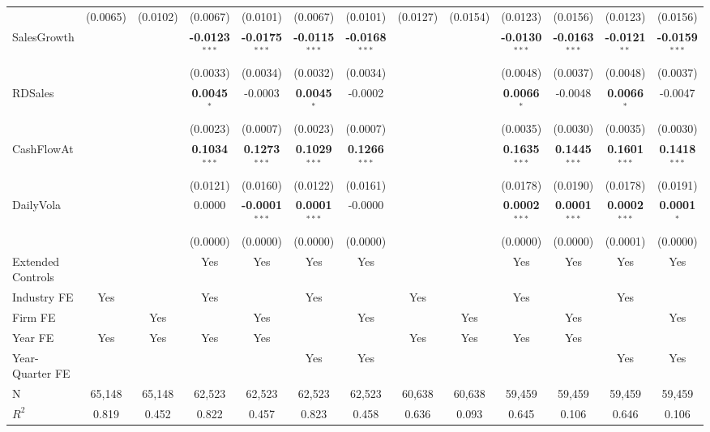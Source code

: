 \begin{landscape}
\begin{table}[H]
\begin{tabular}{lcccccccccccc}
 & (0.0065) & (0.0102) & (0.0067) & (0.0101) & (0.0067) & (0.0101) & (0.0127) & (0.0154) & (0.0123) & (0.0156) & (0.0123) & (0.0156) \\
SalesGrowth &  &  & \textbf{-0.0123}$^{***}$ & \textbf{-0.0175}$^{***}$ & \textbf{-0.0115}$^{***}$ & \textbf{-0.0168}$^{***}$ &  &  & \textbf{-0.0130}$^{***}$ & \textbf{-0.0163}$^{***}$ & \textbf{-0.0121}$^{**}$ & \textbf{-0.0159}$^{***}$ \\
 &  &  & (0.0033) & (0.0034) & (0.0032) & (0.0034) &  &  & (0.0048) & (0.0037) & (0.0048) & (0.0037) \\
RDSales &  &  & \textbf{0.0045}$^{*}$ & -0.0003 & \textbf{0.0045}$^{*}$ & -0.0002 &  &  & \textbf{0.0066}$^{*}$ & -0.0048 & \textbf{0.0066}$^{*}$ & -0.0047 \\
 &  &  & (0.0023) & (0.0007) & (0.0023) & (0.0007) &  &  & (0.0035) & (0.0030) & (0.0035) & (0.0030) \\
CashFlowAt &  &  & \textbf{0.1034}$^{***}$ & \textbf{0.1273}$^{***}$ & \textbf{0.1029}$^{***}$ & \textbf{0.1266}$^{***}$ &  &  & \textbf{0.1635}$^{***}$ & \textbf{0.1445}$^{***}$ & \textbf{0.1601}$^{***}$ & \textbf{0.1418}$^{***}$ \\
 &  &  & (0.0121) & (0.0160) & (0.0122) & (0.0161) &  &  & (0.0178) & (0.0190) & (0.0178) & (0.0191) \\
DailyVola &  &  & 0.0000 & \textbf{-0.0001}$^{***}$ & \textbf{0.0001}$^{***}$ & -0.0000 &  &  & \textbf{0.0002}$^{***}$ & \textbf{0.0001}$^{***}$ & \textbf{0.0002}$^{***}$ & \textbf{0.0001}$^{*}$ \\
 &  &  & (0.0000) & (0.0000) & (0.0000) & (0.0000) &  &  & (0.0000) & (0.0000) & (0.0001) & (0.0000) \\
\midrule
Extended Controls &  &  & Yes & Yes & Yes & Yes &  &  & Yes & Yes & Yes & Yes \\
Industry FE & Yes &  & Yes &  & Yes &  & Yes &  & Yes &  & Yes &  \\
Firm FE &  & Yes &  & Yes &  & Yes &  & Yes &  & Yes &  & Yes \\
Year FE & Yes & Yes & Yes & Yes &  &  & Yes & Yes & Yes & Yes &  &  \\
Year-Quarter FE &  &  &  &  & Yes & Yes &  &  &  &  & Yes & Yes \\
\midrule
N & 65,148 & 65,148 & 62,523 & 62,523 & 62,523 & 62,523 & 60,638 & 60,638 & 59,459 & 59,459 & 59,459 & 59,459 \\
$R^2$ & 0.819 & 0.452 & 0.822 & 0.457 & 0.823 & 0.458 & 0.636 & 0.093 & 0.645 & 0.106 & 0.646 & 0.106 \\

\end{tabular}
\end{table}
\end{landscape}
